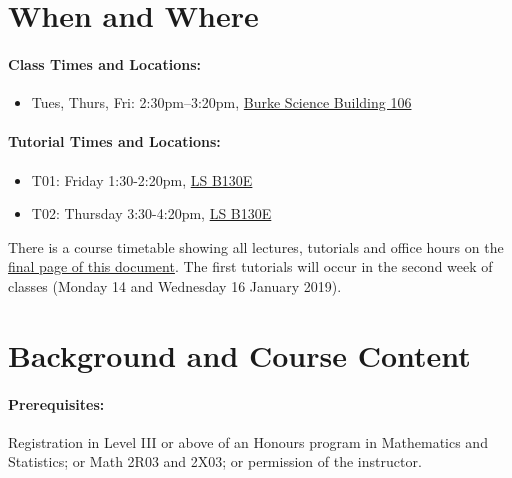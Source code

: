 \documentclass[12pt]{article}
\begin{document}
\section*{When and Where}

\paragraph*{Class Times and Locations:}
\begin{itemize}\addtolength{\itemsep}{-0.75\baselineskip}
\item Tues, Thurs, Fri: 2:30pm--3:20pm,
  \href{https://library.mcmaster.ca/cct/class-dir/bsb-106}{Burke
    Science Building 106}


\end{itemize}

\paragraph*{Tutorial Times and Locations:}
\begin{itemize}\addtolength{\itemsep}{-0.75\baselineskip}
\item T01: Friday 1:30-2:20pm,
  \href{https://library.mcmaster.ca/spaces/cct/classroom-directory}{LS B130E}
\item T02: Thursday 3:30-4:20pm,
  \href{https://library.mcmaster.ca/spaces/cct/classroom-directory}{LS B130E}
\end{itemize}

\noindent
There is a course timetable showing all lectures, tutorials and office
hours on the \hyperlink{timetable}{final page of this document}.
The first tutorials will occur in the second week of classes
(Monday 14 and Wednesday 16 January 2019).

\section*{Background and Course Content}

\paragraph*{Prerequisites:} Registration in Level III or above of an Honours program in Mathematics and Statistics; or Math 2R03 and 2X03; or permission of the instructor.
\end{document}

